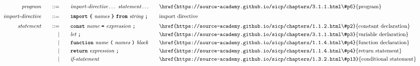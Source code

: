 \begin{alignat*}{9}
&& \textit{program}    &&\quad ::= &\quad && \textit{import-directive} \ldots \ \textit{statement} \ldots
                                                           && \textrm{\href{https://source-academy.github.io/sicp/chapters/3.1.1.html\#p6}{program}} \\[1mm]
&& \textit{import-directive}    &&\quad ::= &\quad && \textbf{\texttt{import}}\ \textbf{\texttt{\{}}\ \textit{names} \ \textbf{\texttt{\}}}\ \textbf{\texttt{from}}\  \textit{string} \ \textbf{\texttt{;}}
                                                           && \textrm{import directive} \\[1mm]
&& \textit{statement}    &&\quad ::= &\quad && \textbf{\texttt{const}}\  \textit{name} \ 
                                           \textbf{\texttt{=}}\  \textit{expression} \ \textbf{\texttt{;}}
                                                           && \textrm{\href{https://source-academy.github.io/sicp/chapters/1.1.2.html\#p2}{constant declaration}} \\
&&                       && |   &\quad && \textit{let} \ \textbf{\texttt{;}}
                                                           && \textrm{\href{https://source-academy.github.io/sicp/chapters/3.1.1.html\#p3}{variable declaration}} \\
&&                       && |   &\quad && \textbf{\texttt{function}}\  \textit{name} \ 
                                   \textbf{\texttt{(}}\  \textit{names} \ \textbf{\texttt{)}}\ \textit{block} \quad
                                                           && \textrm{\href{https://source-academy.github.io/sicp/chapters/1.1.4.html\#p4}{function declaration}}\\
&&                       && |   &\quad && \textbf{\texttt{return}}\  \textit{expression} \ \textbf{\texttt{;}}
                                                           && \textrm{\href{https://source-academy.github.io/sicp/chapters/1.1.4.html\#p4}{return statement}}\\
&&                       && |   &\quad && \textit{if-statement} \quad
                                                           && \textrm{\href{https://source-academy.github.io/sicp/chapters/1.3.2.html\#p13}{conditional statement}}\\

\end{alignat*}
